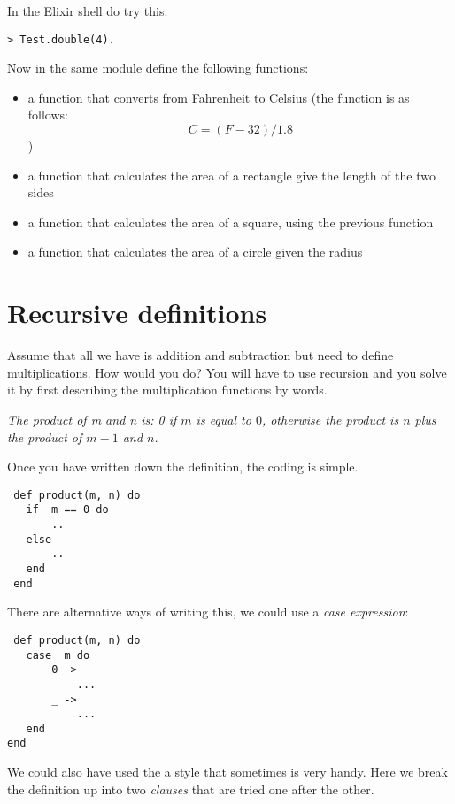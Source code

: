 \documentclass[a4paper,11pt]{article}
\begin{document}
{In the Elixir shell do try this:

\begin{verbatim}
> Test.double(4).
\end{verbatim}

Now in the same module define the following functions:

\begin{itemize}
\item a function that converts from Fahrenheit to Celsius (the
  function is as follows:$$C = (F-32)/1.8$$)

\item a function that calculates the area of a rectangle give the
  length of the two sides

\item a function that calculates the area of a square, using the
  previous function

\item a function that calculates the area of a circle given the radius
\end{itemize} 

\section{Recursive definitions}

Assume that all we have is addition and subtraction but need to define
multiplications. How would you do? You will have to use recursion and
you solve it by first describing the multiplication functions by words.

{\em The product of m and n is: 0 if $m$ is equal to $0$, otherwise the
  product is $n$ plus the product of $m-1$ and $n$.}

Once you have written down the definition, the coding is simple.

\begin{verbatim}
 def product(m, n) do
   if  m == 0 do
       ..
   else 
       ..
   end
 end
\end{verbatim}

There are alternative ways of writing this, we could use a {\em case
  expression}:

\begin{verbatim}
 def product(m, n) do
   case  m do
       0 -> 
           ...
       _ -> 
           ...
   end
end
\end{verbatim}

We could also have used the a style that sometimes is very handy. Here
we break the definition up into two {\em clauses} that are tried one
after the other.

}
\end{document}

